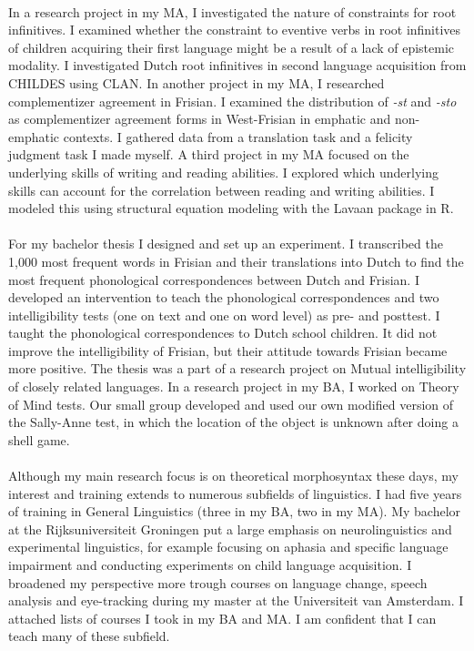\documentclass[12pt]{article}
\begin{document}
\phantom{x}\\

In a research project in my MA, I investigated the nature of constraints for root infinitives. I examined whether the constraint to eventive verbs in root infinitives of children acquiring their first language might be a result of a lack of epistemic modality. I investigated Dutch root infinitives in second language acquisition from CHILDES using CLAN. In another project in my MA, I researched complementizer agreement in Frisian. I examined the distribution of \emph{-st} and \emph{-sto} as complementizer agreement forms in West-Frisian in emphatic and non-emphatic contexts. I gathered data from a translation task and a felicity judgment task I made myself. A third project in my MA focused on the underlying skills of writing and reading abilities. I explored which underlying skills can account for the correlation between reading and writing abilities. I modeled this using structural equation modeling with the Lavaan package in R.\\

\phantom{x}\\

For my bachelor thesis I designed and set up an experiment. I transcribed the 1,000 most frequent words in Frisian and their translations into Dutch to find the most frequent phonological correspondences between Dutch and Frisian. I developed an intervention to teach the phonological correspondences and two intelligibility tests (one on text and one on word level) as pre- and posttest. I taught the phonological correspondences to Dutch school children. It did not improve the intelligibility of Frisian, but their attitude towards Frisian became more positive. The thesis was a part of a research project on Mutual intelligibility of closely related languages. In a research project in my BA, I worked on Theory of Mind tests. Our small group developed and used our own modified version of the Sally-Anne test, in which the location of the object is unknown after doing a shell game.\\

\phantom{x}\\

Although my main research focus is on theoretical morphosyntax these days, my interest and training extends to numerous subfields of linguistics. I had five years of training in General Linguistics (three in my BA, two in my MA). My bachelor at the Rijksuniversiteit Groningen put a large emphasis on neurolinguistics and experimental linguistics, for example focusing on aphasia and specific language impairment and conducting experiments on child language acquisition. I broadened my perspective more trough courses on language change, speech analysis and eye-tracking during my master at the Universiteit van Amsterdam. I attached lists of courses I took in my BA and MA. I am confident that I can teach many of these subfield.\\
\end{document}

